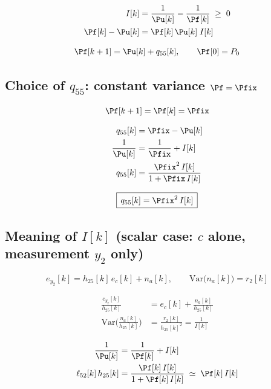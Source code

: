 \[
\begin{aligned}
I[k] &= \frac{1}{\Pu[k]} - \frac{1}{\Pf[k]} \;\ge\; 0 \\
\Pf[k] - \Pu[k] &= \Pf[k]\,\Pu[k]\; I[k]
\end{aligned}
\]

\[
\Pf[k+1] = \Pu[k] + q_{55}[k], \qquad \Pf[0] = P_0
\]

\subsection{Choice of $q_{55}$: constant variance $\Pf = \Pfix$}

\[
\Pf[k+1] = \Pf[k] = \Pfix
\]

\[
\begin{aligned}
q_{55}[k] &= \Pfix - \Pu[k] \\
\frac{1}{\Pu[k]} &= \frac{1}{\Pfix} + I[k] \\
q_{55}[k] &= \frac{\Pfix^{2}\, I[k]}{1 + \Pfix\, I[k]}
\end{aligned}
\]

\[
\boxed{\,q_{55}[k] = \Pfix^{2}\, I[k]\,}
\]

\subsection{Meaning of $I[k]$ (scalar case: $c$ alone, measurement $y_2$ only)}

\[
e_{y_2}[k] = h_{25}[k]\, e_c[k] + n_a[k], \qquad \mathrm{Var}\big(n_a[k]\big) = r_2[k]
\]

\[
\begin{aligned}
\frac{e_{y_2}[k]}{h_{25}[k]} &= e_c[k] + \frac{n_a[k]}{h_{25}[k]} \\
\mathrm{Var}\Big(\frac{n_a[k]}{h_{25}[k]}\Big) &= \frac{r_2[k]}{h_{25}[k]^{2}} = \frac{1}{I[k]}
\end{aligned}
\]

\[
\begin{aligned}
\frac{1}{\Pu[k]} &= \frac{1}{\Pf[k]} + I[k] \\
\ell_{52}[k]\, h_{25}[k] &= \frac{\Pf[k]\, I[k]}{1 + \Pf[k]\, I[k]} \;\simeq\; \Pf[k]\, I[k]
\end{aligned}
\]


